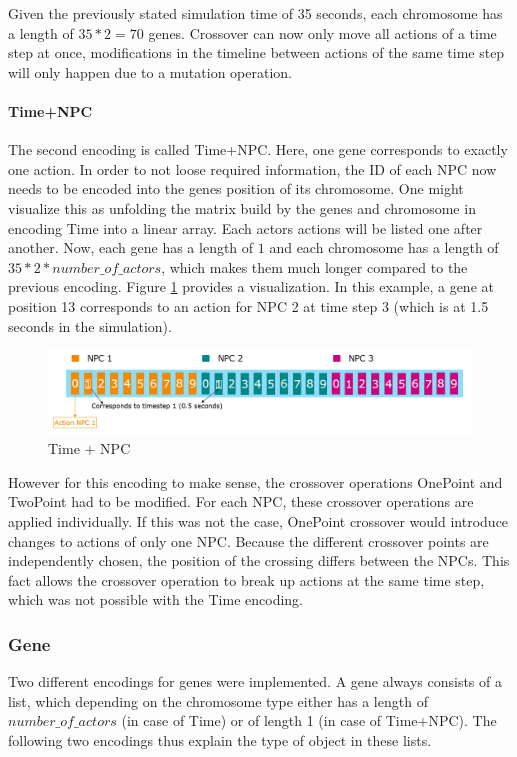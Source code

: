 Given the previously stated simulation time of 35 seconds, each chromosome has a length of $35 * 2 = 70$ genes.
Crossover can now only move all actions of a time step at once, modifications in the timeline between actions of the same time step will only happen due to a mutation operation.

\paragraph{Time+NPC}
The second encoding is called Time+NPC. Here, one gene corresponds to exactly one action. In order to not loose required information, the ID of each NPC now needs to be encoded into the genes position of its chromosome. One might visualize this as unfolding the matrix build by the genes and chromosome in encoding Time into a linear array. Each actors actions will be listed one after another. Now, each gene has a length of $1$ and each chromosome has a length of $35 * 2 * number\_of\_actors$, which makes them much longer compared to the previous encoding. Figure \ref{figure:encoding:chromosome:time_npc} provides a visualization. In this example, a gene at position 13 corresponds to an action for NPC 2 at time step 3 (which is at 1.5 seconds in the simulation).

\begin{figure}[ht] 
	\includegraphics[width=1\linewidth]{figures/time_npc_encoding}
	\caption{Time + NPC}
	\label{figure:encoding:chromosome:time_npc}
\end{figure}

However for this encoding to make sense, the crossover operations OnePoint and TwoPoint had to be modified. For each NPC, these crossover operations are applied individually. If this was not the case, OnePoint crossover would introduce changes to actions of only one NPC. Because the different crossover points are independently chosen, the position of the crossing differs between the NPCs. This fact allows the crossover operation to break up actions at the same time step, which was not possible with the Time encoding.

\subsubsection{Gene}
Two different encodings for genes were implemented. A gene always consists of a list, which depending on the chromosome type either has a length of $number\_of\_actors$ (in case of Time) or of length 1 (in case of Time+NPC). The following two encodings thus explain the type of object in these lists.

